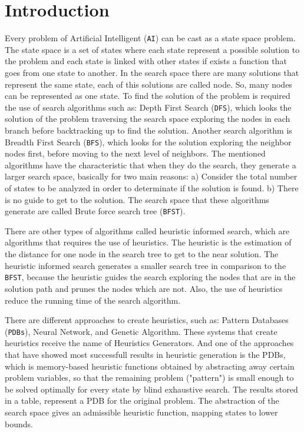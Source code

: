 \documentclass[a4paper,12pt]{article}
\begin{document}
\section{Introduction}
Every problem of Artificial Intelligent (\texttt{AI}) can be cast as a state space problem. The state space is a set of states where each state represent a possible solution to the problem and each state is linked with other states if exists a function that goes from one state to another. In the search space there are many solutions that represent the same state, each of this solutions are called node. So, many nodes can be represented as one state. To find the solution of the problem is required the use of search algorithms such as: Depth First Search (\texttt{DFS}), which looks the solution of the problem traversing the search space exploring the nodes in each branch before backtracking up to find the solution. Another search algorithm is Breadth First Search (\texttt{BFS}), which looks for the solution exploring the neighbor nodes first, before moving to the next level of neighbors. The mentioned algorithms have the characteristic that when they do the search, they generate a larger search space, basically for two main reasons: a) Consider the total number of states to be analyzed in order to determinate if the solution is found. b) There is no guide to get to the solution. The search space that these algorithms generate are called Brute force search tree (\texttt{BFST}).

There are other types of algorithms called heuristic informed search, which are algorithms that requires the use of heuristics. The heuristic is the estimation of the distance for one node in the search tree to get to the near solution. The heuristic informed search generates a smaller search tree in comparison to the \texttt{BFST}, because the heuristic guides the search exploring the nodes that are in the solution path and prunes the nodes which are not. Also, the use of heuristics reduce the running time of the search algorithm.

There are different approaches to create heuristics, such as: Pattern Databases (\texttt{PDBs}), Neural Network, and Genetic Algorithm. These systems that create heuristics receive the name of Heuristics Generators. And one of the approaches that have showed most successfull results in heuristic generation is the PDBs, which is memory-based heuristic functions obtained by abstracting away certain problem variables, so that the remaining problem ("pattern") is small enough to be solved optimally for every state by blind exhaustive search. The results stored in a table, represent a PDB for the original problem. The abstraction of the search space gives an admissible heuristic function, mapping states to lower bounds.
\end{document}
